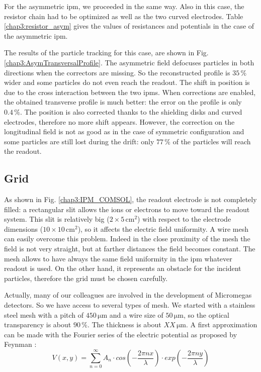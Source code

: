 \begin{refsection}
  For the asymmetric \acrshort{ipm}, we proceeded in the same way. Also in this case, the resistor chain had to be optimized as well as the two curved electrodes. Table \ref{chap3:resistor_asym} gives the values of resistances and potentials in the case of the asymmetric \acrshort{ipm}.

  

  The results of the particle tracking for this case, are shown in Fig. \ref{chap3:AsymTransversalProfile}. The asymmetric field defocuses particles in both directions when the correctors are missing. So the reconstructed profile is $35\,\mathrm{\%}$ wider and some particles do not even reach the readout. The shift in position is due to the cross interaction between the two \acrshort{ipm}s. When corrections are enabled, the obtained transverse profile is much better: the error on the profile is only $0.4\,\mathrm{\%}$. The position is also corrected thanks to the shielding disks and curved electrodes, therefore no more shift appears. However, the correction on the longitudinal field is not as good as in the case of symmetric configuration and some particles are still lost during the drift: only $77\,\mathrm{\%}$ of the particles will reach the readout.

  

  \subsection{Grid}
  \label{chap3:sec:grid}
  As shown in Fig. \ref{chap3:IPM_COMSOL}, the readout electrode is not completely filled: a rectangular slit allows the ions or electrons to move toward the readout system. This slit is relatively big ($2\times5\,\mathrm{cm^{2}}$) with respect to the electrode dimensions ($10\times10\,\mathrm{cm^{2}}$), so it affects the electric field uniformity. A wire mesh can easily overcome this problem. Indeed in the close proximity of the mesh the field is not very straight, but at farther distances the field becomes constant. The mesh allows to have always the same field uniformity in the \acrshort{ipm} whatever readout is used. On the other hand, it represents an obstacle for the incident particles, therefore the grid must be chosen carefully.

  Actually, many of our colleagues are involved in the development of Micromegas detectors. So we have access to several types of mesh. We started with a stainless steel mesh with a pitch of $450\,\mathrm{\mu m}$ and a wire size of $50\,\mathrm{\mu m}$, so the optical transparency is about $90\,\mathrm{\%}$. The thickness is about $XX\,\mathrm{\mu m}$. A first approximation can be made with the Fourier series of the electric potential as proposed by Feynman \cite{feynman2011feynman}:
  \begin{equation}
    V(x,y)= \sum^{\infty}_{n=0} A_{n} \cdot cos(-\frac{2\pi n x}{\lambda}) \cdot exp(-\frac{2\pi n y}{\lambda})
  \end{equation}


\end{refsection}
